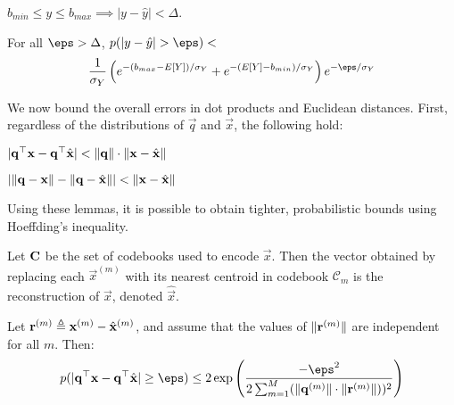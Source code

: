 \begin{lemma}
$b_{min} \le y \le b_{max} \implies |y - \hat{y}| < \Delta$.
\end{lemma}

\begin{lemma}
For all $\eps > \Delta$, \hspace{1mm} $p(|y - \hat{y}| > \eps) <$
\begin{align}
        \frac{1}{\sigma_Y} \left(
            e^{-(b_{max}- E[Y]) / \sigma_Y}
            + e^{-(E[Y] - b_{min}) / \sigma_Y}
        \right)e^{-\eps / \sigma_Y}
\end{align}
\end{lemma}

We now bound the overall errors in dot products and Euclidean distances. First, regardless of the distributions of $\vec{q}$ and $\vec{x}$, the following hold:

\begin{lemma}
$\lvert\mathbf{q}^\top \mathbf{x} - \mathbf{q}^\top \hat{\mathbf{x}}\rvert < \lVert\mathbf{q}\rVert \cdot \lVert\mathbf{x} - \hat{\mathbf{x}}\rVert$
\end{lemma}

\begin{lemma}
$\lvert\lVert\mathbf{q} - \mathbf{x}\rVert - \lVert\mathbf{q} - \hat{\mathbf{x}}\rVert \rvert < \lVert\mathbf{x} - \hat{\mathbf{x}}\rVert$
\end{lemma}

\noindent Using these lemmas, it is possible to obtain tighter, probabilistic bounds using Hoeffding's inequality.

\begin{definition}[Reconstruction]
Let $\mathbf{C}$ be the set of codebooks used to encode $\vec{x}$. Then the vector obtained by replacing each $\vec{x}^{(m)}$ with its nearest centroid in codebook $\mathcal{C}_m$ is the reconstruction of $\vec{x}$, denoted $\hat{\vec{x}}$.
\end{definition}

\begin{lemma}
Let $\mathbf{r}^{(m)} \triangleq \mathbf{x}^{(m)} - \hat{\mathbf{x}}^{(m)}$, and assume that the values of $\lVert \mathbf{r}^{(m)} \rVert$ are independent for all $m$. Then: %
\begin{align} \label{eq:dot_indep}
    p(\abs{\q^\top \x - \q^\top \xhat} \ge \eps) \le 2\exp \left( \frac{-\eps^2}{
        2 \sum_{m=1}^M (\norm{\q^{(m)}} \cdot \norm{ \r^{(m)} }))^2
    }\right)
\end{align}
\end{lemma}



